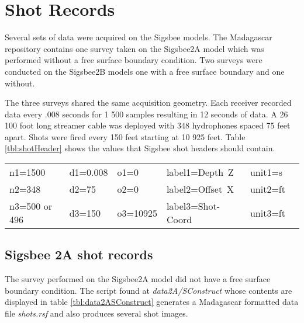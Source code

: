 

\section{Shot Records}
Several sets of data were acquired on the Sigsbee models.  The Madagascar repository contains one survey taken on the 
Sigsbee2A model which was performed without a free surface boundary condition.  Two surveys were conducted on the Sigsbee2B  
models one with a free surface boundary and one without.  

The three surveys shared the same acquisition geometry.  Each receiver recorded data every .008 seconds for 1 500 samples resulting 
in 12 seconds of data.  A 26 100 foot long streamer cable was deployed with 348 hydrophones spaced 75 feet apart.  Shots were fired
every 150 feet starting at 10 925 feet.  Table \ref{tbl:shotHeader} shows the values that Sigsbee shot headers should contain.  

{
\begin{tabular}[t]{|llllll|}
        \hline 
        n1=1500  &   d1=0.008	&  o1=0     &    label1=Depth\ Z    &   unit1=s    &  \\
	n2=348	 &   d2=75 	&  o2=0     &    label2=Offset\ X   &   unit2=ft   &  \\
	n3=500 or 496   &   d3=150     &  o3=10925 &    label3=Shot-Coord  &   unit3=ft   &  \\
        \hline
\end{tabular}
}

\subsection{Sigsbee 2A shot records}
The survey performed on the Sigsbee2A model did not have a free surface boundary condition.  The script found at 
\emph{data2A/SConstruct} whose contents are displayed in table \ref{tbl:data2ASConstruct} generates a Madagascar 
formatted data file \emph{shots.rsf} and also produces several shot images. 
  
{
\tiny

\normalsize
}

